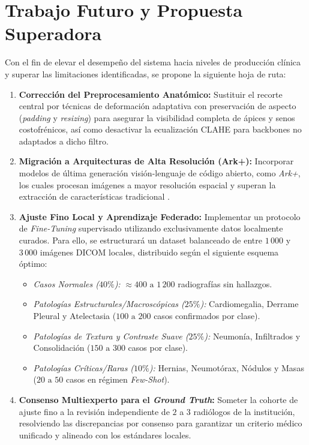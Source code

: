 \documentclass[../tesis.tex]{subfiles}
\begin{document}
\section{Trabajo Futuro y Propuesta Superadora}

Con el fin de elevar el desempeño del sistema hacia niveles de producción clínica y superar las limitaciones identificadas, se propone la siguiente hoja de ruta:

\begin{enumerate}
    \item \textbf{Corrección del Preprocesamiento Anatómico:} Sustituir el recorte central por técnicas de deformación adaptativa con preservación de aspecto (\textit{padding} y \textit{resizing}) para asegurar la visibilidad completa de ápices y senos costofrénicos, así como desactivar la ecualización CLAHE para backbones no adaptados a dicho filtro.

    \item \textbf{Migración a Arquitecturas de Alta Resolución (Ark+):} Incorporar modelos de última generación visión-lenguaje de código abierto, como \textit{Ark+}, los cuales procesan imágenes a mayor resolución espacial y superan la extracción de características tradicional \citep{ark_nature_2025,jlianglab_ark_repo}.

    \item \textbf{Ajuste Fino Local y Aprendizaje Federado:} Implementar un protocolo de \textit{Fine-Tuning} supervisado utilizando exclusivamente datos localmente curados. Para ello, se estructurará un dataset balanceado de entre $1\,000$ y $3\,000$ imágenes DICOM locales, distribuido según el siguiente esquema óptimo:
    \begin{itemize}
        \item \textit{Casos Normales ($40\%$):} $\approx 400\text{ a }1\,200$ radiografías sin hallazgos.
        \item \textit{Patologías Estructurales/Macroscópicas ($25\%$):} Cardiomegalia, Derrame Pleural y Atelectasia ($100\text{ a }200$ casos confirmados por clase).
        \item \textit{Patologías de Textura y Contraste Suave ($25\%$):} Neumonía, Infiltrados y Consolidación ($150\text{ a }300$ casos por clase).
        \item \textit{Patologías Críticas/Raras ($10\%$):} Hernias, Neumotórax, Nódulos y Masas ($20\text{ a }50$ casos en régimen \textit{Few-Shot}).
    \end{itemize}

    \item \textbf{Consenso Multiexperto para el \textit{Ground Truth}:} Someter la cohorte de ajuste fino a la revisión independiente de $2$ a $3$ radiólogos de la institución, resolviendo las discrepancias por consenso para garantizar un criterio médico unificado y alineado con los estándares locales.
\end{enumerate}
\end{document}
